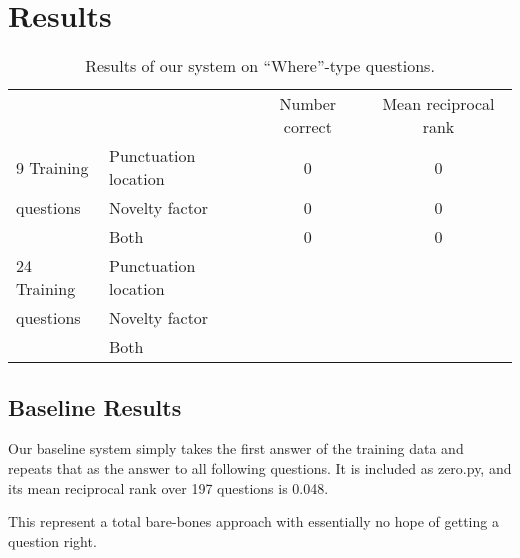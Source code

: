 \documentclass{article}
\begin{document}
\section{Results}
\begin{table}
\begin{tabular}{llcc}
\cmidrule{2-4}
               &       & Number correct & Mean reciprocal rank\\
\cmidrule{2-4}
9 Training&Punctuation location &   0            &      0              \\
questions&Novelty factor       &    0           &       0             \\
&Both                 &             0  &                0    \\
\cmidrule{2-4}
24 Training&Punctuation location &                &                     \\
questions&Novelty factor       &                &                     \\
&Both                 &                &                     \\
\cmidrule{2-4}
\end{tabular}
\caption{\label{tab:results}Results of our system on ``Where''-type questions. }
\end{table}

\subsection{Baseline Results}
Our baseline system simply takes the first answer of the training data and
repeats that as the answer to all following questions. It is included as
zero.py, and its mean reciprocal rank over 197 questions is 0.048.  

This represent a total bare-bones approach with essentially no hope of getting a
question right.
\end{document}
